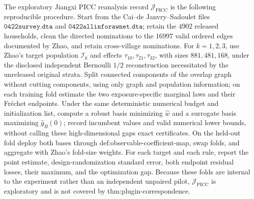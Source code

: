 The exploratory Jiangxi PICC reanalysis record \(\mathcal J_{\mathrm{PICC}}\) is the following reproducible procedure.  Start from the Cai--de Janvry--Sadoulet files \(\texttt{0422survey.dta}\) and \(\texttt{0422allinforawnet.dta}\); retain the \(4902\) released households, clean the directed nominations to the \(16997\) valid ordered edges documented by Zhao, and retain cross-village nominations.  For \(k=1,2,3\), use Zhao's target population \(\mathcal I_k\) and effects \(\tau_{10},\tau_{21},\tau_{32}\), with sizes \(881,481,168\), under the disclosed independent Bernoulli \(1/2\) reconstruction necessitated by the unreleased original strata.  Split connected components of the overlap graph without cutting components, using only graph and population information; on each training fold estimate the two exposure-specific marginal laws and their Fr\'echet endpoints.  Under the same deterministic numerical budget and initialization list, compute a robust basis minimizing \(\widehat w\) and a surrogate basis maximizing \(\widehat g_B(0)\); record incumbent values and valid numerical lower bounds, without calling these high-dimensional gaps exact certificates.  On the held-out fold deploy both bases through def:observable-coefficient-map, swap folds, and aggregate with Zhao's fold-size weights.  For each target and each rule, report the point estimate, design-randomization standard error, both endpoint residual losses, their maximum, and the optimization gap.  Because these folds are internal to the experiment rather than an independent unpaired pilot, \(\mathcal J_{\mathrm{PICC}}\) is exploratory and is not covered by thm:plugin-correspondence.